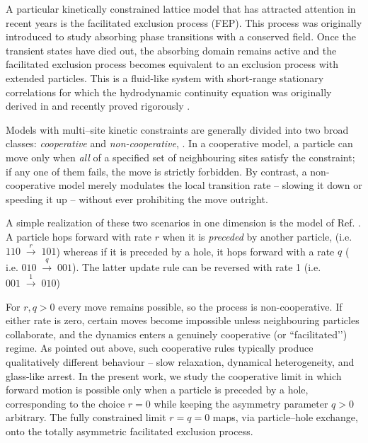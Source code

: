 \documentclass[pdflatex,sn-mathphys-num]{sn-jnl}
\theoremstyle{definition}
\theoremstyle{remark}
\numberwithin{equation}{section}
\begin{document}
A particular kinetically constrained lattice model that has attracted attention in recent years is the facilitated exclusion process (FEP)\cite{Ross00,basu2009active,gabel2010facilitated,Ayye23,Lei23}. This process was originally introduced to study absorbing phase transitions with a conserved field. Once the transient states have died out, the absorbing domain remains active and the facilitated exclusion process becomes equivalent to an exclusion process with extended particles.
This is a fluid-like system with short-range stationary correlations for which the hydrodynamic continuity equation was originally derived in \cite{Scho04}
and recently proved rigorously \cite{Blon20,Blon21}.

Models with multi–site kinetic constraints are generally divided into two broad classes: 
{\it cooperative} and {\it non-cooperative}, \cite{toninelli2005cooperative,shapira2024noncooperative}.
In a cooperative model, a particle can move only when {\it all} of a specified set of neighbouring sites satisfy the constraint; if any one of them fails, the move is strictly forbidden. 
By contrast, a non-cooperative model merely  modulates the local transition rate -- slowing it down or speeding it up -- without ever prohibiting the move outright.

A simple realization of these two scenarios in one dimension is the model of Ref. \cite{helbing1999global}.  
A particle hops forward with rate \(r\) when it is {\it preceded} by another particle, (i.e. $110 \;\xrightarrow{\,r\,}\; 101$)
whereas if it is preceded by a hole, it hops forward with a rate $q$ ( i.e. $010 \; \xrightarrow{\,q\,}\; 001$). The latter update rule can be reversed with rate 1 (i.e. $001 \; \xrightarrow{\,1\,} \; 010$)


For \(r,q>0\) every move remains possible, so the process is non-cooperative.  
If either rate is zero, certain moves become impossible unless neighbouring particles collaborate, and the dynamics enters a genuinely cooperative (or “facilitated’’) regime.  As pointed out above, 
such cooperative rules typically produce qualitatively different behaviour -- slow relaxation, dynamical heterogeneity, and glass-like arrest.  
In the present work, we study the cooperative limit in which forward motion is possible  only when a particle is preceded by a hole, corresponding to the  
choice \(r=0\) 
while keeping the asymmetry parameter \(q>0\)
arbitrary.  The fully constrained limit \(r=q=0\) maps, via particle–hole exchange, onto the totally asymmetric facilitated exclusion process.
\end{document}
